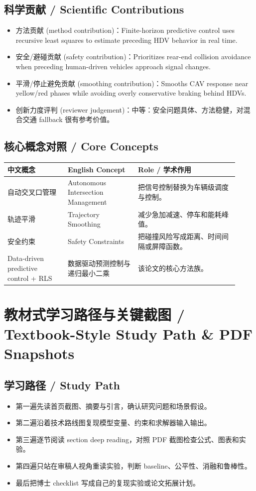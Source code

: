 \documentclass[UTF8,a4paper,11pt,fontset=fandol]{ctexart}
\begin{document}
\subsection{科学贡献 / Scientific Contributions}
\begin{itemize}
\item 方法贡献 (method contribution)：Finite-horizon predictive control uses recursive least squares to estimate preceding HDV behavior in real time.
\item 安全/避碰贡献 (safety contribution)：Prioritizes rear-end collision avoidance when preceding human-driven vehicles approach signal changes.
\item 平滑/停止避免贡献 (smoothing contribution)：Smooths CAV response near yellow/red phases while avoiding overly conservative braking behind HDVs.
\item 创新力度评判 (reviewer judgement)：中等：安全问题具体、方法稳健，对混合交通 fallback 很有参考价值。
\end{itemize}


\subsection{核心概念对照 / Core Concepts}
\begin{longtable}{p{0.24\linewidth}p{0.28\linewidth}p{0.40\linewidth}}
\toprule
中文概念 & English Concept & Role / 学术作用\\
\midrule
自动交叉口管理 & Autonomous Intersection Management & 把信号控制替换为车辆级调度与控制。 \\
轨迹平滑 & Trajectory Smoothing & 减少急加减速、停车和能耗峰值。 \\
安全约束 & Safety Constraints & 把碰撞风险写成距离、时间间隔或屏障函数。 \\
Data-driven predictive control + RLS & 数据驱动预测控制与递归最小二乘 & 该论文的核心方法族。 \\
\bottomrule
\end{longtable}

\section{教材式学习路径与关键截图 / Textbook-Style Study Path \& PDF Snapshots}
\subsection{学习路径 / Study Path}
\begin{itemize}
\item 第一遍先读首页截图、摘要与引言，确认研究问题和场景假设。
\item 第二遍沿着技术路线图复现模型变量、约束和求解器输入输出。
\item 第三遍逐节阅读 section deep reading，对照 PDF 截图检查公式、图表和实验。
\item 第四遍只站在审稿人视角重读实验，判断 baseline、公平性、消融和鲁棒性。
\item 最后把博士 checklist 写成自己的复现实验或论文拓展计划。
\end{itemize}
\end{document}
